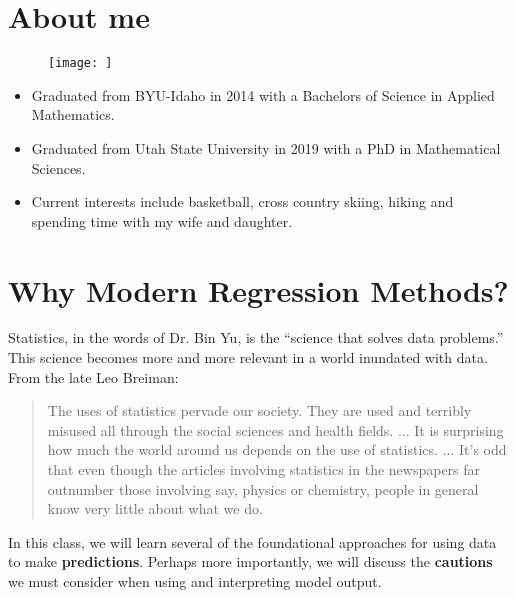 \documentclass[12pt]{notes}
\begin{document}

\section{About me}

\begin{figure}
\texttt{[image: ]}
\end{figure}

\begin{itemize}
\item Graduated from BYU-Idaho in 2014 with a Bachelors of Science in Applied Mathematics.
\item Graduated from Utah State University in 2019 with a PhD in Mathematical Sciences.
\item Current interests include basketball, cross country skiing, hiking and spending time with my wife and daughter.
\end{itemize}



\begin{minipage}[l][2cm][c]{\textwidth}

\end{minipage}

\section{Why Modern Regression Methods?}

Statistics, in the words of Dr. Bin Yu, is the ``science that solves data problems.'' This science becomes more and more relevant in a world inundated with data. From the late Leo Breiman:

\begin{quotation}
The uses of statistics pervade our society. They are used and terribly misused all through the social sciences and health fields. ... It is surprising how much the world around us depends on the use of statistics. ... It’s odd that even though the articles involving statistics in the newspapers far outnumber those involving say, physics or chemistry, people in general know very little about what we do.
\end{quotation}

In this class, we will learn several of the foundational approaches for using data to make \textbf{predictions}. Perhaps more importantly, we will discuss the \textbf{cautions} we must consider when using and interpreting model output. 
\end{document}
